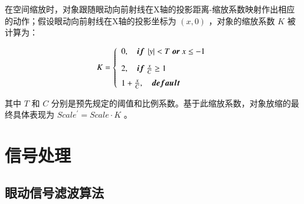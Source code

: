 在空间缩放时，对象跟随眼动向前射线在X轴的投影距离-缩放系数映射作出相应的动作；假设眼动向前射线在X轴的投影坐标为 $(x, 0)$ ，对象的缩放系数 $K$ 被计算为：

\begin{equation}
	\label{formula-3-7}
	K = 
    \left\{
    \begin{array}{l}
        0, \quad {\mbox{\boldmath $if$}}\ \left|y\right| < T\ {\mbox{\boldmath $or$}}\ x \le -1 \\ [0.3cm]
        2, \quad {\mbox{\boldmath $if$}}\ \frac{x}{C} \ge 1 \\ [0.2cm]
        1 + \frac{x}{C},\quad {\mbox{\boldmath $default$}}
    \end{array}
    \right.
\end{equation}

其中 $T$ 和 $C$ 分别是预先规定的阈值和比例系数。基于此缩放系数，对象放缩的最终具体表现为 $Scale^\prime = Scale \cdot K$ 。

\section{信号处理}

\subsection{眼动信号滤波算法}


